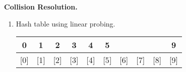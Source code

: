 \textbf{Collision Resolution.}
    \begin{enumerate} 
      \item Hash table using linear probing.
    \begin{table}[h]
      \centering
      \begin{tabular}{cccccccccc}
      \hline
      \multicolumn{1}{|c|}{0} & \multicolumn{1}{c|}{1} & \multicolumn{1}{c|}{2} & \multicolumn{1}{c|}{3} & \multicolumn{1}{c|}{4} & \multicolumn{1}{c|}{5} & \multicolumn{1}{c|}{} & \multicolumn{1}{c|}{} & \multicolumn{1}{c|}{} & \multicolumn{1}{c|}{9} \\ \hline
      {[}0{]}                    & {[}1{]}                   & {[}2{]}                   & {[}3{]}                  & {[}4{]}                  & {[}5{]}                  & {[}6{]}               & {[}7{]}               & {[}8{]}               & {[}9{]}                  
      \end{tabular}
      \end{table}

    \end{enumerate}
